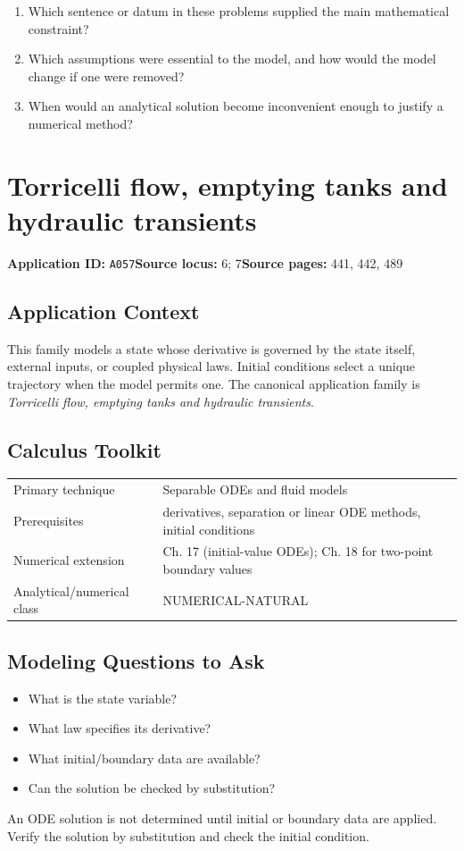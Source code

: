 \documentclass[11pt]{book}
\newcommand{\pid}[1]{\texttt{#1}}
\begin{document}
\begin{reflectionbox}\begin{enumerate}
\item Which sentence or datum in these problems supplied the main mathematical constraint?
\item Which assumptions were essential to the model, and how would the model change if one were removed?
\item When would an analytical solution become inconvenient enough to justify a numerical method?
\end{enumerate}\end{reflectionbox}
\chapter{Torricelli flow, emptying tanks and hydraulic transients}\label{app:A057}
\textbf{Application ID:} \pid{A057}\quad \textbf{Source locus:} 6; 7\quad \textbf{Source pages:} 441, 442, 489
\section*{Application Context}
This family models a state whose derivative is governed by the state itself, external inputs, or coupled physical laws. Initial conditions select a unique trajectory when the model permits one. The canonical application family is \emph{Torricelli flow, emptying tanks and hydraulic transients}.
\section*{Calculus Toolkit}
\begin{tabularx}{\textwidth}{@{}lX@{}}\toprule
Primary technique & Separable ODEs and fluid models \\
Prerequisites & derivatives, separation or linear ODE methods, initial conditions \\
Numerical extension & Ch. 17 (initial-value ODEs); Ch. 18 for two-point boundary values \\
Analytical/numerical class & NUMERICAL-NATURAL \\
\bottomrule\end{tabularx}
\section*{Modeling Questions to Ask}\begin{itemize}
\item What is the state variable?
\item What law specifies its derivative?
\item What initial/boundary data are available?
\item Can the solution be checked by substitution?
\end{itemize}
\begin{errorbox}An ODE solution is not determined until initial or boundary data are applied. Verify the solution by substitution and check the initial condition.\end{errorbox}
\end{document}
